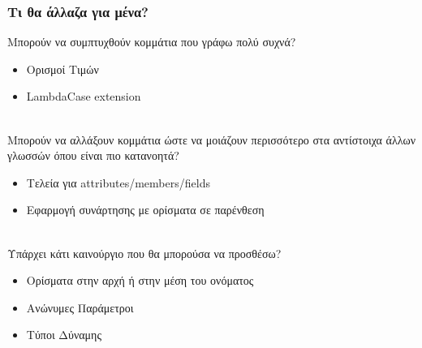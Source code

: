 \documentclass{beamer}
\def\e{\foreignlanguage{english}}
\begin{document}
\begin{frame}

\frametitle{Τι θα άλλαζα για μένα?}

Μπορούν να συμπτυχθούν κομμάτια που γράφω πολύ συχνά?
\begin{itemize}

\item Ορισμοί Τιμών

\item \e{LambdaCase extension}
\\~\

\end{itemize}

Μπορούν να αλλάξουν κομμάτια ώστε να μοιάζουν περισσότερο στα αντίστοιχα άλλων
γλωσσών όπου είναι πιο κατανοητά?
\begin{itemize}

\item Τελεία για \e{attributes/members/fields}

\item Εφαρμογή συνάρτησης με ορίσματα σε παρένθεση
\\~\

\end{itemize}

Υπάρχει κάτι καινούργιο που θα μπορούσα να προσθέσω?
\begin{itemize}

\item Ορίσματα στην αρχή ή στην μέση του ονόματος

\item Ανώνυμες Παράμετροι

\item Τύποι Δύναμης

\end{itemize}

\end{frame}
\end{document}
